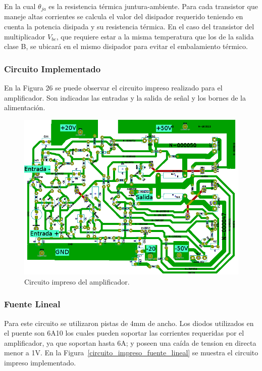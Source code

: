 En la cual $\theta_{ja}$ es la resistencia térmica juntura-ambiente. Para cada transistor que maneje altas corrientes se calcula el valor del disipador requerido teniendo en cuenta la potencia disipada y su resistencia térmica. En el caso del transistor del multiplicador $V_{be}$, que requiere estar a la misma temperatura que los de la salida clase B, se ubicará en el mismo disipador para evitar el embalamiento térmico.

\subsubsection{Circuito Implementado}

En la Figura 26 se puede observar el circuito impreso realizado para el amplificador. Son indicadas las entradas y la salida de señal y los bornes de la alimentación.

\begin{figure}[H]
\centerline{
\includegraphics[width=1\textwidth]
{img/PCB1.png}}
\caption{Circuito impreso del amplificador.}
\end{figure}

\subsubsection{Fuente Lineal}
\medskip
Para este circuito se utilizaron pistas de 4mm de ancho. Los diodos utilizados en el puente son 6A10 los cuales pueden soportar las corrientes requeridas por el amplificador, ya que soportan hasta 6A; y poseen una caída de tension en directa menor a 1V.
En la Figura~\ref{circuito_impreso_fuente_lineal} se muestra el circuito impreso implementado. 



